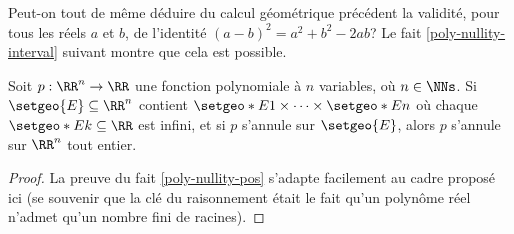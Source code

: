 Peut-on tout de même déduire du calcul géométrique précédent la validité, pour tous les réels $a$ et $b$, de l'identité $(a - b)^2 = a^2 + b^2 - 2ab$?
Le fait \ref{poly-nullity-interval} suivant montre que cela est possible. 


\medskip

\begin{fact} \label{poly-nullity-interval}
	Soit $p: \RR^n \rightarrow \RR$ une fonction polynomiale à $n$ variables, où $n \in \NNs$.
	Si $\setgeo{E} \subseteq \RR^n$ contient $\setgeo*{E}{1} \times \cdots \times \setgeo*{E}{n}$ où chaque $\setgeo*{E}{k} \subseteq \RR$ est infini,
	et si $p$ s'annule sur $\setgeo{E}$,
	alors $p$ s'annule sur $\RR^n$ tout entier. 
\end{fact}


\begin{proof}
	La preuve du fait \ref{poly-nullity-pos} s'adapte facilement au cadre proposé ici (se souvenir que la clé du raisonnement était le fait qu'un polynôme réel n'admet qu'un nombre fini de racines).
\end{proof}




\medskip

